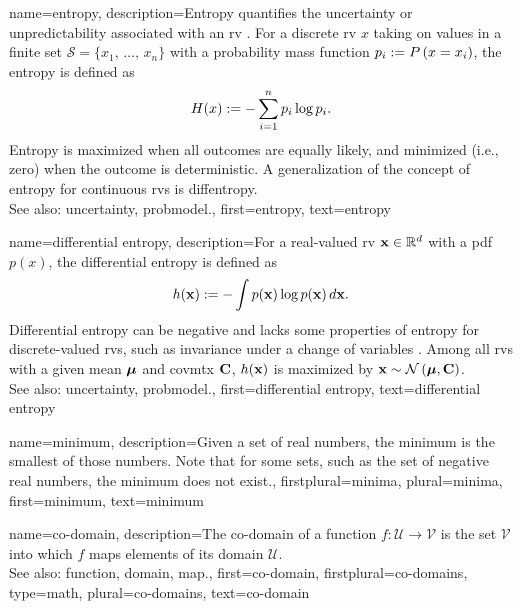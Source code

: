 {name={entropy},
	description={Entropy quantifies the \gls{uncertainty} or unpredictability associated with an \gls{rv} \cite{coverthomas}. 
		For a discrete \gls{rv} $x$ taking on values in a finite set $\mathcal{S} = \{x_1, \,\ldots, \,x_n\}$ with 
		a \gls{probability} mass \gls{function} $p_i := P\left(x = x_i\right)$, the entropy is defined as
		\[
		H(x) := -\sum_{i=1}^n p_i \log p_i.
		\]
		Entropy is maximized when all outcomes are equally likely, and minimized (i.e., zero) 
		when the outcome is deterministic. A \gls{generalization} of the concept of entropy for continuous 
		\glspl{rv} is \gls{diffentropy}. 
		\\
		See also: \gls{uncertainty}, \gls{probmodel}.},
	first={entropy},
	text={entropy}
}

{name={differential entropy},
	description={For a real-valued \gls{rv} ${\bf x} \in \mathbb{R}^{d}$ 
		with a \gls{pdf} $p(x)$, the differential \gls{entropy} is defined as \cite{coverthomas}
		\[
		h({\bf x}) := - \int p({\bf x}) \log p({\bf x}) \, d{\bf x}.
		\]
		Differential \gls{entropy} can be negative and lacks some properties of \gls{entropy} for 
		discrete-valued \glspl{rv}, such as invariance under a change of variables \cite{coverthomas}. 
		Among all \glspl{rv} with a given \gls{mean} ${\bm \mu}$ and \gls{covmtx} ${\bf C}$, 
		$h({\bf x})$ is maximized by ${\bf x} \sim \mathcal{N}\left({\bm \mu},{\bf C}\right)$. 
		\\
		See also: \gls{uncertainty}, \gls{probmodel}.},
	first={differential entropy},
	text={differential entropy}
}

{name={minimum},
	description={Given a set of real numbers, the minimum is the smallest of those numbers.
		Note that for some sets, such as the set of negative real numbers, the minimum does not exist.},
	firstplural={minima}, 
 	plural={minima},
	first={minimum},
	text={minimum}
}


{name={co-domain}, 
	description={The co-domain of a \gls{function} 
	$f: \mathcal{U} \rightarrow \mathcal{V}$ is the set $\mathcal{V}$ 
		into which $f$ maps elements of its domain $\mathcal{U}$.  
		\\
		See also: \gls{function}, \gls{domain}, \gls{map}.},
	first={co-domain},
	firstplural={co-domains}, 
	type=math, 
	plural={co-domains},
	text={co-domain}
}

